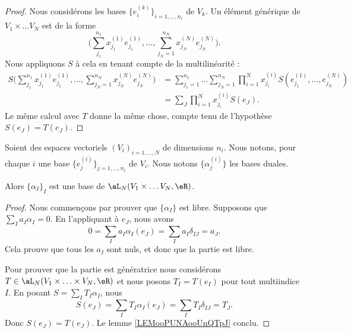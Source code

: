 \begin{proof}
	Nous considérons les bases \( \{ e^{(k)}_i \}_{i=1,\ldots,n_i}\) de \( V_k\). Un élément générique de \( V_1\times \ldots V_N\) est de la forme
	\begin{equation}
		\Big(  \sum_{j_1}^{n_1}x_{j_1}^{(1)}e^{(1)}_{j_1},\ldots, \sum_{j_N=1}^{n_N}x_{j_N}^{(N)}e_{j_N}^{(N)} \Big).
	\end{equation}
	Nous appliquons \( S\) à cela en tenant compte de la multilinéarité :
	\begin{subequations}
		\begin{align}
			S\Big(  \sum_{j_1}^{n_1}x_{j_1}^{(1)}e^{(1)}_{j_1},\ldots, \sum_{j_N=1}^{n_N}x_{j_N}^{(N)}e_{j_N}^{(N)} \Big) & =\sum_{j_1=1}^{n_1}\ldots \sum_{j_N=1}^{n_N}\prod_{i=1}^Nx_{j_i}^{(i)}S(e^{(1)}_{j_1},\ldots,e_{j_N}^{(N)}) \\
			                                                                                                              & =\sum_J\prod_{i=1}^Nx_{j_i}^{(i)}S(e_J).
		\end{align}
	\end{subequations}
	Le même calcul avec \( T\) donne la même chose, compte tenu de l'hypothèse \( S(e_J)=T(e_J)\).
\end{proof}

\begin{theorem}		\label{THOooTAGKooDscwFG}
	Soient des espaces vectoriels \( (V_i)_{i=1,\ldots,N}\) de dimensions \( n_i\). Nous notons, pour chaque \( i\) une base \( \{ e_j^{(i)}\}_{j=1,\ldots,n_i} \) de \( V_i\). Nous notons \( \{ \alpha_j^{(i)} \}\) les bases duales.

	Alors \( \{ \alpha_I \}_I\) est une base de \( \aL_N(V_1\times \ldots V_N,\eR)\).
\end{theorem}

\begin{proof}
	Nous commençons par prouver que \( \{ \alpha_I \}\) est libre. Supposons que \( \sum_Ia_I\alpha_I=0\). En l'appliquant à \( e_J\), nous avons
	\begin{equation}
		0=\sum_Ia_I\alpha_I(e_J)=\sum_{I}a_I\delta_{IJ}=a_J.
	\end{equation}
	Cela prouve que tous les \( a_I\) sont nuls, et donc que la partie est libre.

	Pour prouver que la partie est génératrice nous considérons \( T\in \aL_N(V_1\times\ldots\times V_N,\eR)\) et nous posons \( T_I=T(e_I)\) pour tout multiindice \( I\). En posant \( S=\sum_IT_I\alpha_I\), nous
	\begin{equation}
		S(e_J)=\sum_{I}T_I\alpha_I(e_J)=\sum_IT_I\delta_{IJ}=T_J.
	\end{equation}
	Donc \( S(e_J)=T(e_J)\). Le lemme \ref{LEMooPUNAooUnQTpJ} conclu.
\end{proof}

